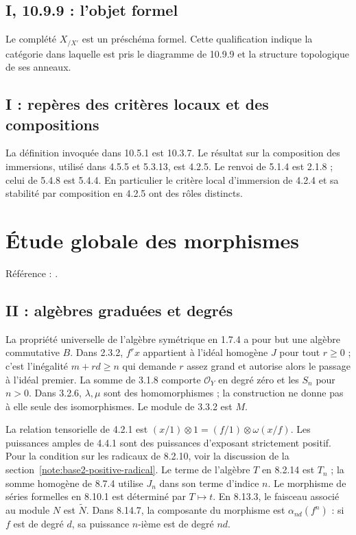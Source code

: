 \documentclass[11pt,a4paper]{article}
\begin{document}
\subsection{I, 10.9.9 : l’objet formel}
\label{note:base1-formalname}
Le complété $X_{/X'}$ est un préschéma formel.
Cette qualification indique la catégorie dans laquelle est pris
le diagramme de 10.9.9 et la structure topologique de ses anneaux.

\subsection{I : repères des critères locaux et des compositions}
\label{note:base1-refs}
La définition invoquée dans 10.5.1 est 10.3.7.
Le résultat sur la composition des immersions, utilisé dans 4.5.5
et 5.3.13, est 4.2.5. Le renvoi de 5.1.4 est 2.1.8 ; celui de
5.4.8 est 5.4.4. En particulier le critère local d'immersion
de 4.2.4 et sa stabilité par composition en 4.2.5 ont des rôles distincts.
\par

\section{Étude globale des morphismes}
\label{part:base2}
Référence : \cite{EGAII}.
\subsection{II : algèbres graduées et degrés}
\label{note:base2-graded}
La propriété universelle de l'algèbre symétrique en 1.7.4 a pour
but une algèbre commutative $B$. Dans 2.3.2, $f^rx$ appartient
à l'idéal homogène $J$ pour tout $r\geq0$ ; c'est l'inégalité
$m+rd\geq n$ qui demande $r$ assez grand et autorise alors
le passage à l'idéal premier. La somme de 3.1.8 comporte
$\mathcal O_Y$ en degré zéro et les $S_n$ pour $n>0$.
Dans 3.2.6, $\lambda,\mu$ sont des homomorphismes ; la construction
ne donne pas à elle seule des isomorphismes. Le module de 3.3.2
est $M$.

La relation tensorielle de 4.2.1 est
$(x/1)\otimes1=(f/1)\otimes\omega(x/f)$.
Les puissances amples de 4.4.1 sont des puissances d'exposant
strictement positif. Pour la condition sur les radicaux de 8.2.10, voir la
discussion de la section~\ref{note:base2-positive-radical}.
Le terme de l'algèbre $T$ en 8.2.14 est $T_n$ ; la somme homogène
de 8.7.4 utilise $J_n$ dans son terme d'indice $n$.
Le morphisme de séries formelles en 8.10.1 est déterminé par
$T\mapsto t$.
En 8.13.3, le faisceau associé au module $N$ est $\widetilde N$.
Dans 8.14.7, la composante du morphisme est
$\alpha_{nd}(f^n)$ : si $f$ est de degré $d$, sa puissance
$n$-ième est de degré $nd$.
\end{document}
